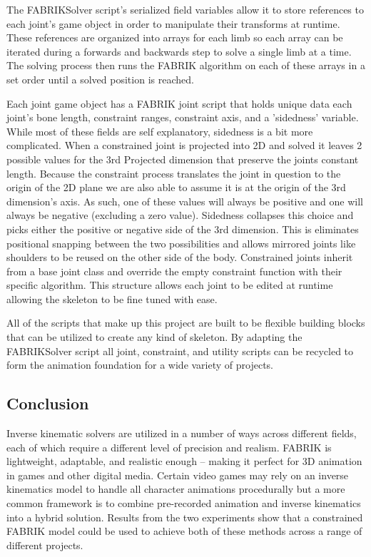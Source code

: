 \documentclass[10pt,twocolumn]{article}
\begin{document}
The FABRIKSolver script's serialized field variables allow it to store references to each joint's game object in order to manipulate their transforms at runtime. These references are organized into arrays for each limb so each array can be iterated during a forwards and backwards step to solve a single limb at a time. The solving process then runs the FABRIK algorithm on each of these arrays in a set order until a solved position is reached. 

Each joint game object has a FABRIK joint script that holds unique data each joint's bone length, constraint ranges, constraint axis, and a 'sidedness' variable. While most of these fields are self explanatory, sidedness is a bit more complicated. When a constrained joint is projected into 2D and solved it leaves 2 possible values for the 3rd Projected dimension that preserve the joints constant length. Because the constraint process translates the joint in question to the origin of the 2D plane we are also able to assume it is at the origin of the 3rd dimension's axis. As such, one of these values will always be positive and one will always be negative (excluding a zero value). Sidedness collapses this choice and picks either the positive or negative side of the 3rd dimension. This is eliminates positional snapping between the two possibilities and allows mirrored joints like shoulders to be reused on the other side of the body. Constrained joints inherit from a base joint class and override the empty constraint function with their specific algorithm. This structure allows each joint to be edited at runtime allowing the skeleton to be fine tuned with ease. 

All of the scripts that make up this project are built to be flexible building blocks that can be utilized to create any kind of skeleton. By adapting the FABRIKSolver script all joint, constraint, and utility scripts can be recycled to form the animation foundation for a wide variety of projects. 


\subsection{Conclusion}

Inverse kinematic solvers are utilized in a number of ways across different fields, each of which require a different level of precision and realism. FABRIK is lightweight, adaptable, and realistic enough – making it perfect for 3D animation in games and other digital media. Certain video games may rely on an inverse kinematics model to handle all character animations procedurally but a more common framework is to combine pre-recorded animation and inverse kinematics into a hybrid solution. Results from the two experiments show that a constrained FABRIK model could be used to achieve both of these methods across a range of different projects. 
\end{document}
